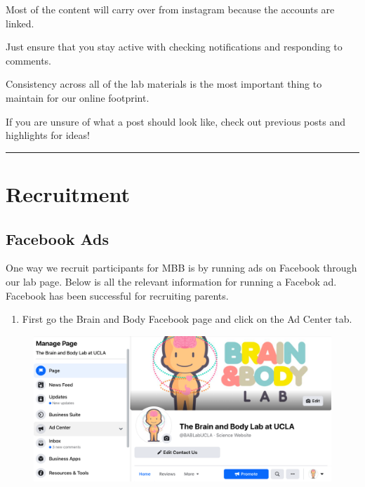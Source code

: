 \documentclass[]{book}
\providecommand{\tightlist}{%
  \setlength{\itemsep}{0pt}\setlength{\parskip}{0pt}}
\begin{document}
Most of the content will carry over from instagram because the accounts are linked.

Just ensure that you stay active with checking notifications and responding to comments.

Consistency across all of the lab materials is the most important thing to maintain for our online footprint.

If you are unsure of what a post should look like, check out previous posts and highlights for ideas!

\begin{center}\rule{0.5\linewidth}{0.5pt}\end{center}

\hypertarget{recruitment}{%
\section{Recruitment}\label{recruitment}}

\hypertarget{facebook-ads}{%
\subsection{Facebook Ads}\label{facebook-ads}}

One way we recruit participants for MBB is by running ads on Facebook through our lab page. Below is all the relevant information for running a Facebok ad. Facebook has been successful for recruiting parents.

\begin{enumerate}
\def\labelenumi{\arabic{enumi}.}
\tightlist
\item
  First go the Brain and Body Facebook page and click on the Ad Center tab.
\end{enumerate}

\begin{figure}
\centering
\includegraphics{images/lab_protocols/fb_ads/1.png}
\caption{}
\end{figure}
\end{document}
